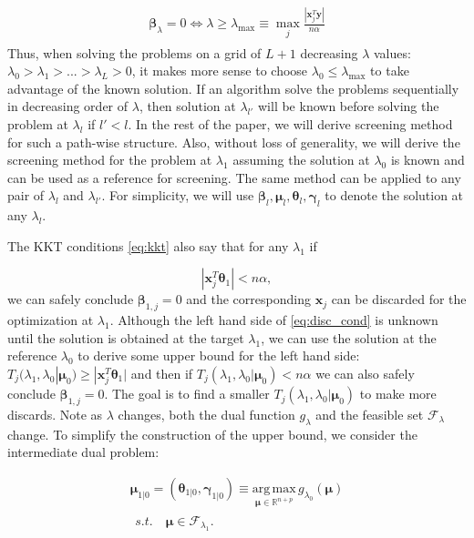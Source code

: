 \begin{gather}
    \label{eq:lammax}
    \begin{aligned}
        \boldsymbol\beta_\lambda=0\iff \lambda \geq \lambda_{\max}\equiv \max_j \frac{|\boldsymbol x_j^T\boldsymbol y|}{n\alpha}
    \end{aligned}
\end{gather}
Thus, when solving the problems on a grid of $L+1$ decreasing $\lambda$ values: $\lambda_0>\lambda_1>...>\lambda_L>0$, it makes more sense to choose $\lambda_0\leq\lambda_{\max}$ to take advantage of the known solution. If an algorithm solve the problems sequentially in decreasing order of $\lambda$, then solution at $\lambda_{l'}$ will be known before solving the problem at $\lambda_l$ if $l'<l$. In the rest of the paper, we will derive screening method for such a path-wise structure. Also, without loss of generality, we will derive the screening method for the problem at $\lambda_1$ assuming the solution at $\lambda_0$ is known and can be used as a reference for screening. The same method can be applied to any pair of $\lambda_{l}$ and $\lambda_{l'}$. For simplicity, we will use $\boldsymbol\beta_l,\boldsymbol\mu_l,\boldsymbol\theta_l,\boldsymbol\gamma_l$ to denote the solution at any $\lambda_l$.

The KKT conditions \eqref{eq:kkt} also say that for any $\lambda_1$ if 

\begin{equation}
    \label{eq:disc_cond}
    |\boldsymbol x_j^T\boldsymbol\theta_{1}|<n\alpha,
\end{equation}
we can safely conclude $\boldsymbol\beta_{1,j}=0$ and the corresponding $\boldsymbol x_j$ can be discarded for the optimization at $\lambda_1$. Although the left hand side of \eqref{eq:disc_cond} is unknown until the solution is obtained at the target $\lambda_1$, we can use the solution at the reference $\lambda_{0}$ to derive some upper bound for the left hand side: $T_j(\lambda_{1},\lambda_{0}|\boldsymbol\mu_0)\geq |\boldsymbol x_j^T\boldsymbol\theta_1|$ and then if $T_j(\lambda_{1},\lambda_{0}|\boldsymbol\mu_0)<n\alpha$ we can also safely conclude $\boldsymbol\beta_{1,j}=0$. The goal is to find a smaller $T_j(\lambda_{1},\lambda_{0}|\boldsymbol\mu_0)$ to make more discards. Note as $\lambda$ changes, both the dual function $g_\lambda$ and the feasible set $\mathcal{F}_\lambda$ change. To simplify the construction of the upper bound, we consider the intermediate dual problem:

\begin{gather}
        \label{eq:dualmi}
        \boldsymbol\mu_{1|0}=(\boldsymbol\theta_{1|0},\boldsymbol\gamma_{1|0})\equiv\underset{\boldsymbol\mu\in \mathbb{R}^{ n+p}}{\mathrm{arg\,max}}\,g_{\lambda_0}(\boldsymbol\mu)\\
        \begin{aligned}s.t.\quad \boldsymbol\mu\in \mathcal{F}_{\lambda_1}\nonumber.
        \end{aligned}
\end{gather}

